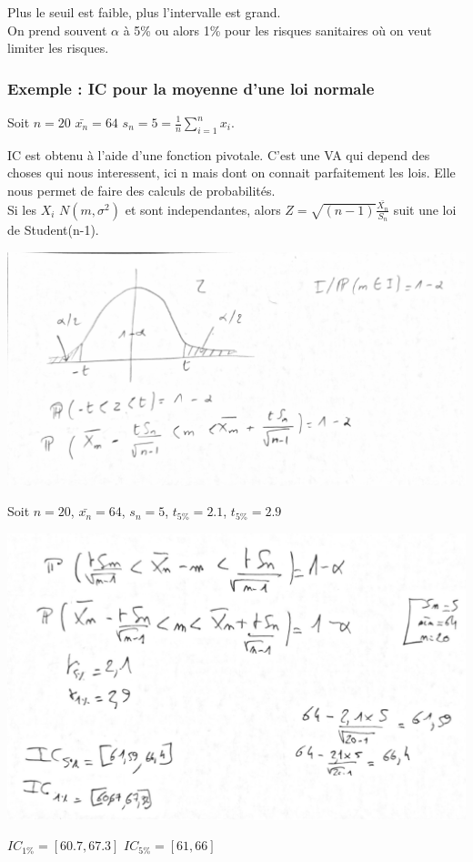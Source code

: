\documentclass[11pt]{article}
\begin{document}
Plus le seuil est faible, plus l'intervalle est grand.\\
On prend souvent $\alpha$ à 5\% ou alors 1\% pour les risques sanitaires où on veut limiter les risques.

\pagebreak

\subsubsection{Exemple : IC pour la moyenne d'une loi normale}
Soit $n=20$  $\bar{x_{n}}=64$  $s_{n}=5=\frac{1}{n}\sum_{i=1}^{n}x_{i}$.

IC est obtenu à l'aide d'une fonction pivotale.
C'est une VA qui depend des choses qui nous interessent, ici n mais dont on connait parfaitement les lois. Elle nous permet de faire des calculs de probabilités.\\

Si les $X_{i}$ $N(m,\sigma^{2})$ et sont independantes, alors $Z=\sqrt{(n-1)}\frac{\bar{X_{n}}}{S_{n}}$  suit une loi de Student(n-1).

\centerline{\includegraphics[scale=0.6]{img/ic.pdf}}

Soit $n=20$,  $\bar{x_{n}}=64$,  $s_{n}=5$, $t_{5\%} = 2.1$, $t_{5\%} =2.9$ 

\centerline{\includegraphics[scale=0.6]{img/calcul_ic.pdf}}

$IC_{1\%} = [60.7, 67.3]$ \qquad
$IC_{5\%} = [61, 66]$
\end{document}
